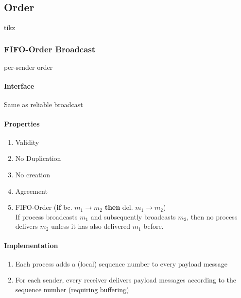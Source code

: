 \documentclass{article}
\begin{document}
\begin{adjustwidth}{2em}{2em}
		\subsection{Order}
		\begin{center}
			tikz
		\end{center}
		\begin{adjustwidth}{2em}{2em}
			\subsubsection{\textsc{FIFO}-Order Broadcast}
			\begin{adjustwidth}{2em}{}
				per-sender order
				\paragraph{Interface}
				\begin{adjustwidth}{1em}{}
					Same as reliable broadcast
				\end{adjustwidth}
				\paragraph{Properties}
				\begin{adjustwidth}{1em}{}
					\begin{enumerate}[-]
						\item Validity
						\item No Duplication
						\item No creation
						\item Agreement
						\item FIFO-Order (\textbf{if} bc. $m_1 \rightarrow m_2$ \textbf{then} del. $m_1 \rightarrow m_2$) \\
						If process broadcasts $m_1$ and subsequently broadcasts $m_2$, then no process delivers $m_2$ unless it has also delivered $m_1$ before.
					\end{enumerate}
				\end{adjustwidth}
				\paragraph{Implementation}
				\begin{adjustwidth}{1em}{}
					\begin{enumerate}[\small{\textbullet}]
						\item Each process adds a (local) sequence number to every payload message
						\item For each sender, every receiver delivers payload messages according to the sequence number (requiring buffering)
					\end{enumerate}
				\end{adjustwidth}
			\end{adjustwidth}

\end{adjustwidth}
\end{adjustwidth}
\end{document}
